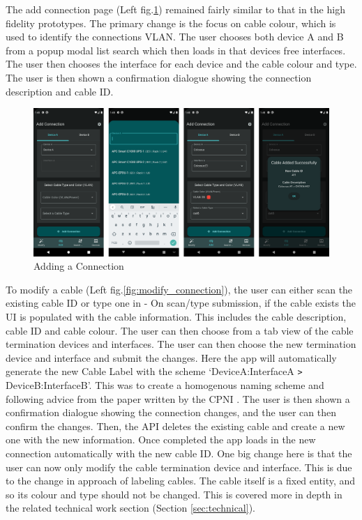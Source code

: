 \documentclass [11pt,a4paper]{article}
\begin{document}
The add connection page (Left fig.\ref{fig:add_connection}) remained fairly similar to that in the high fidelity prototypes. The primary change is the focus on cable colour, which is used to identify the connections VLAN. The user chooses both device A and B from a popup modal list search which then loads in that devices free interfaces. The user then chooses the interface for each device and the cable colour and type. The user is then shown a confirmation dialogue showing the connection description and cable ID.  

\begin{figure}[H]
    \centering
    \includegraphics[width=\textwidth]{images/final_add.png}
    \caption{Adding a Connection}
    \label{fig:add_connection}
\end{figure}

 
To modify a cable (Left fig.\ref{fig:modify_connection}), the user can either scan the existing cable ID or type one in - On scan/type submission, if the cable exists the UI is populated with the cable information. This includes the cable description, cable ID and cable colour. The user can then choose from a tab view of the cable termination devices and interfaces. The user can then choose the new termination device and interface and submit the changes. Here the app will automatically generate the new Cable Label with the scheme `DeviceA:InterfaceA \verb|>| DeviceB:InterfaceB'. This was to create a homogenous naming scheme and following advice from the paper written by the CPNI \cite{cpni}. The user is then shown a confirmation dialogue showing the connection changes, and the user can then confirm the changes. Then, the API deletes the existing cable and create a new one with the new information. Once completed the app loads in the new connection automatically with the new cable ID. One big change here is that the user can now only modify the cable termination device and interface. This is due to the change in approach of labeling cables. The cable itself is a fixed entity, and so its colour and type should not be changed. This is covered more in depth in the related technical work section (Section \ref{sec:technical}).
\end{document}
